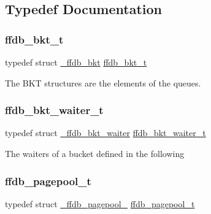 \subsection{Typedef Documentation}
\mbox{\label{adat-devel_2other__libs_2filedb_2filehash_2ffdb__pagepool_8h_a7d7436d10d66de8bbe2325c37cd7a5ef}} 
\subsubsection{\texorpdfstring{ffdb\_bkt\_t}{ffdb\_bkt\_t}}
{\footnotesize\ttfamily typedef struct \mbox{\hyperlink{struct__ffdb__bkt}{\+\_\+ffdb\+\_\+bkt}}  \mbox{\hyperlink{adat-devel_2other__libs_2filedb_2filehash_2ffdb__pagepool_8h_a7d7436d10d66de8bbe2325c37cd7a5ef}{ffdb\+\_\+bkt\+\_\+t}}}

The B\+KT structures are the elements of the queues. \mbox{\label{adat-devel_2other__libs_2filedb_2filehash_2ffdb__pagepool_8h_accd1d1333df4b3ff0bb77b691fc9d126}} 
\subsubsection{\texorpdfstring{ffdb\_bkt\_waiter\_t}{ffdb\_bkt\_waiter\_t}}
{\footnotesize\ttfamily typedef struct \mbox{\hyperlink{struct__ffdb__bkt__waiter}{\+\_\+ffdb\+\_\+bkt\+\_\+waiter}} \mbox{\hyperlink{adat-devel_2other__libs_2filedb_2filehash_2ffdb__pagepool_8h_accd1d1333df4b3ff0bb77b691fc9d126}{ffdb\+\_\+bkt\+\_\+waiter\+\_\+t}}}

The waiters of a bucket defined in the following \mbox{\label{adat-devel_2other__libs_2filedb_2filehash_2ffdb__pagepool_8h_a73290f737b0e5f8be90a0fa96ddf6ab6}} 
\subsubsection{\texorpdfstring{ffdb\_pagepool\_t}{ffdb\_pagepool\_t}}
{\footnotesize\ttfamily typedef struct \mbox{\hyperlink{struct__ffdb__pagepool__}{\+\_\+ffdb\+\_\+pagepool\+\_\+}} \mbox{\hyperlink{adat-devel_2other__libs_2filedb_2filehash_2ffdb__pagepool_8h_a73290f737b0e5f8be90a0fa96ddf6ab6}{ffdb\+\_\+pagepool\+\_\+t}}}

